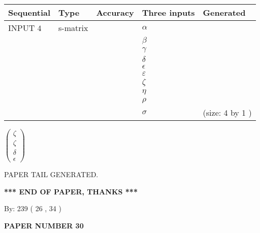 \documentclass[12pt]{article}
\begin{document}
  
\noindent\begin{tabular}{|l|l|l|l|l|}
\hline
 Sequential & Type & Accuracy & Three inputs & Generated \\ 
\hline
 
 
  INPUT $  4 $ & s-matrix & & 
 $  \alpha $ & 
  \\
  & & & 
 $  \beta $ & 
  \\
  & & & 
 $  \gamma $ & 
  \\
  & & & 
 $  \delta $ & 
  \\
  & & & 
 $  \epsilon $ & 
  \\
  & & & 
 $  \varepsilon $ & 
  \\
  & & & 
 $                     \zeta $ & 
  \\
  & & & 
 $  \eta $ & 
  \\
  & & & 
 $  \rho $ & 
  \\
  & & & 
 $  \sigma $ & 
  (size:  4  by  1 )
 \\  \hline  
 \end{tabular}
   
   
 $  \left( \begin{array}
 {
 c
 }
                    \zeta \\ 
                    \zeta \\ 
 \delta \\ 
 \epsilon
 \end{array} \right) $ 
   
   
   
   
 \vspace{0.2in}
 
   
   
\vspace{2.0in} PAPER TAIL GENERATED.
   
   
   
   
\vspace{1.0in} 
{\textbf{\large{ *** END OF PAPER, THANKS *** }}} 
   
   
\hspace{1.0in} By: 
 239 ( 26 ,  34 )
   
   
   
   
\newpage 
\setcounter{page}{ 
    30001 } 
   
   
   
   
 {\textbf{ \Large{ PAPER NUMBER  30  }}}
   
   
\vspace{0.2in}
   
   
   
\end{document}
